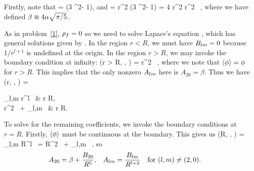 \begin{solution}
	Firstly, note that
	\beq
		\Ytotv =   (3 \cos^2\tht - 1),
	\eeq
	and
	\beq
		\phio = \alp r^2 (3 \cos^2\tht - 1) = 4 \alp r^2  \Ytotv \equiv \beta r^2 \, \Ytotv,
	\eeq
	where we have defined $\beta \equiv 4 \alpha \sqrt{\pi/5}$.

	As in problem~\ref{1}, $\rho_f = 0$ so we need to solve Lapace's equation , which has general solutions given by .  In the region $r < R$, we must have $B_{l m} = 0$ because $1/r^{l+1}$ is undefined at the origin.  In the region $r > R$, we may invoke the boundary condition at infinity:
	\beq
		\phi(r > R, \tht, \vph) \to \phio = \beta r^2 \, \Ytotv,
	\eeq
	where we note that $\evphi = \phi$ for $r > R$.  This implies that the only nonzero $A_{l m}$ here is $A_{2 0} = \beta$.  Thus we have
	\beq
		\evphi\!(r, \tht, \vph) = \begin{cases} \displaystyle \sum_{l,m} \Alm r^l \, \Ylm\tv & \tif r \leq R, \\[2ex]
		\beta r^2 \, \Ytotv + \displaystyle \sum_{l,m}  \, \Ylm\tv & \tif r \geq R. \end{cases}
	\eeq
	
	To solve for the remaining coefficients, we invoke the boundary conditions at $r = R$.  Firstly, $\evphi$ must be continuous at the boundary.  This gives us
	\beq
		\evphi\!(R, \tht, \vph) = \sum_{l,m} \Alm R^l \, \Ylm\tv = \beta R^2 \, \Ytotv + \sum_{l,m}  \, \Ylm\tv,
	\eeq
	so
	\begin{align} \label{c1}
		A_{2 0} &= \beta + \dfrac{B_{2 0}}{R^{5}}, &
		A_{l m} &= \frac{B_{l m}}{R^{l+3}} \quad \text{for } (l,m) \neq (2,0).
	\end{align}
	

\end{solution}
